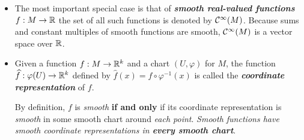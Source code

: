\documentclass[11pt]{article}
\begin{document}
\begin{itemize}
\item The most important special case is that of \emph{\textbf{smooth real-valued functions}} $f: M \rightarrow {\mathbb R}$ the set of all such functions is denoted by ${\mathcal C}^{\infty}(M)$. Because sums and constant multiples of smooth functions are smooth, ${\mathcal C}^{\infty}(M)$ is a vector space over ${\mathbb R}$.

\item \begin{definition}
Given a function $f: M \rightarrow {\mathbb R}^k$ and a chart $(U, \varphi)$ for $M$, the function $\widehat{f}: \varphi(U) \rightarrow {\mathbb R}^k$ defined by $\widehat{f}(x) = f \circ \varphi^{-1}(x)$ is called the \emph{\textbf{coordinate representation}} of $f$. 
\end{definition}

By definition, $f$ is \emph{smooth} \textbf{if and only} if its coordinate representation is \emph{smooth} in some smooth chart around \emph{each point}. \emph{Smooth functions have smooth coordinate representations in \textbf{every smooth chart}}.
\end{itemize}
\end{document}
